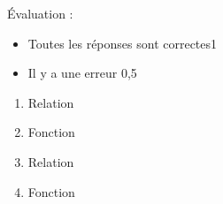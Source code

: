 %
%
    Évaluation :
    \begin{itemize}
        \item Toutes les réponses sont correctes\hfill 1
        \item Il y a une erreur \hfill 0,5
    \end{itemize}
    \begin{enumerate}[cols=4]
        \item Relation
        \item Fonction
        \item Relation
        \item Fonction
    \end{enumerate}
